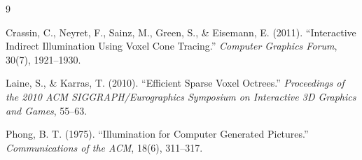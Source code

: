 \documentclass[12pt]{article}
\begin{document}
\newpage


\begin{thebibliography}{9}

Crassin, C., Neyret, F., Sainz, M., Green, S., \& Eisemann, E. (2011).
``Interactive Indirect Illumination Using Voxel Cone Tracing.''
\emph{Computer Graphics Forum}, 30(7), 1921--1930.

Laine, S., \& Karras, T. (2010).
``Efficient Sparse Voxel Octrees.''
\emph{Proceedings of the 2010 ACM SIGGRAPH/Eurographics Symposium on Interactive 3D Graphics and Games}, 55--63.

Phong, B. T. (1975).
``Illumination for Computer Generated Pictures.''
\emph{Communications of the ACM}, 18(6), 311--317.

\end{thebibliography}
\end{document}
